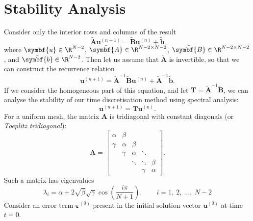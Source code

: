\documentclass{article}
\begin{document}
\section{Stability Analysis}
Consider only the interior rows and columns of the result
\begin{equation*}
    \tilde{\symbf{A}} \symbf{u}^{\left( n+1 \right)} = \tilde{\symbf{B}} \symbf{u}^{\left( n \right)} + \tilde{\symbf{b}}
\end{equation*}
where \(\symbf{u} \in \R^{N - 2}\), \(\tilde{\symbf{A}} \in \R^{N - 2 \times N - 2}\),
\(\tilde{\symbf{B}} \in \R^{N - 2 \times N - 2}\), and \(\tilde{\symbf{b}} \in \R^{N - 2}\).
Then let us assume that \(\tilde{\symbf{A}}\) is invertible, so that we
can construct the recurrence relation
\begin{equation*}
    \symbf{u}^{\left( n+1 \right)} = \tilde{\symbf{A}}^{-1} \tilde{\symbf{B}} \symbf{u}^{\left( n \right)} + \tilde{\symbf{A}}^{-1} \tilde{\symbf{b}}.
\end{equation*}
If we consider the homogeneous part of this equation, and let
\(\symbf{T} = \tilde{\symbf{A}}^{-1} \tilde{\symbf{B}}\), we can
analyse the stability of our time discretisation method using
spectral analysis:
\begin{equation*}
    \symbf{u}^{\left( n+1 \right)} = \symbf{T} \symbf{u}^{\left( n \right)}.
\end{equation*}
For a uniform mesh, the matrix \(\symbf{A}\) is tridiagonal with constant
diagonals (or \textit{Toeplitz tridiagonal}):
\begin{equation*}
    \symbf{A} =
    \begin{bmatrix}
        \alpha & \beta  &        &        &        \\
        \gamma & \alpha & \beta  &        &        \\
               & \gamma & \alpha & \ddots &        \\
               &        & \ddots & \ddots & \beta  \\
               &        &        & \gamma & \alpha
    \end{bmatrix}
    .
\end{equation*}
Such a matrix has eigenvalues
\begin{equation*}
    \lambda_i = \alpha + 2 \sqrt{\beta} \sqrt{\gamma} \cos\left( \frac{i \pi}{N+1} \right), \qquad i = 1,\: 2,\: \ldots,\: N-2
\end{equation*}
Consider an error term \(\symbf{\varepsilon}^{\left( 0 \right)}\) present in the
initial solution vector \(\symbf{u}^{\left( 0 \right)}\) at time \(t = 0\).
\end{document}
